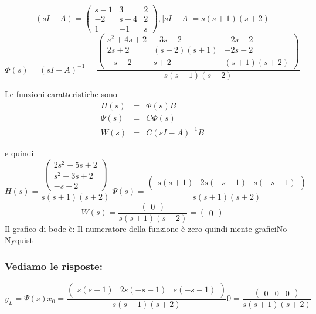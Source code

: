 \documentclass{article}
\begin{document}
\[ (sI-A) = \left(\begin{matrix}s - 1 & 3 & 2\\-2 & s + 4 & 2\\1 & -1 & s\end{matrix}\right), |sI-A| = s \left(s + 1\right) \left(s + 2\right) \]
\[ \Phi(s) = (sI-A)^{-1} = \frac{\left(\begin{matrix}s^{2} + 4 s + 2 & - 3 s - 2 & - 2 s - 2\\2 s + 2 & \left(s - 2\right) \left(s + 1\right) & - 2 s - 2\\- s - 2 & s + 2 & \left(s + 1\right) \left(s + 2\right)\end{matrix}\right)}{s \left(s + 1\right) \left(s + 2\right)} \]

Le funzioni caratteristiche sono \[\begin{array}{rcl}  H(s) & = & \Phi(s)B \\ \Psi(s) & = & C \Phi(s)\\ W(s) & = & C(sI-A)^{-1}B  \end{array} \]

e quindi \[ H(s)  =  \frac{\left(\begin{matrix}2 s^{2} + 5 s + 2\\s^{2} + 3 s + 2\\- s - 2\end{matrix}\right)}{s \left(s + 1\right) \left(s + 2\right)} \ \Psi(s) = \frac{\left(\begin{matrix}s \left(s + 1\right) & 2 s \left(- s - 1\right) & s \left(- s - 1\right)\end{matrix}\right)}{s \left(s + 1\right) \left(s + 2\right)} \]
\[ W(s)  =  \frac{\left(\begin{matrix}0\end{matrix}\right)}{s \left(s + 1\right) \left(s + 2\right)} = \left(\begin{matrix}0\end{matrix}\right)  \] 
Il grafico di bode è:
Il numeratore della funzione è zero quindi niente graficiNo Nyquist
\subsubsection{Vediamo le risposte:}
\[ y_L = \Psi(s) x_0 = \frac{\left(\begin{matrix}s \left(s + 1\right) & 2 s \left(- s - 1\right) & s \left(- s - 1\right)\end{matrix}\right)}{s \left(s + 1\right) \left(s + 2\right)} 0 = \frac{\left(\begin{matrix}0 & 0 & 0\end{matrix}\right)}{s \left(s + 1\right) \left(s + 2\right)} \]
\end{document}
